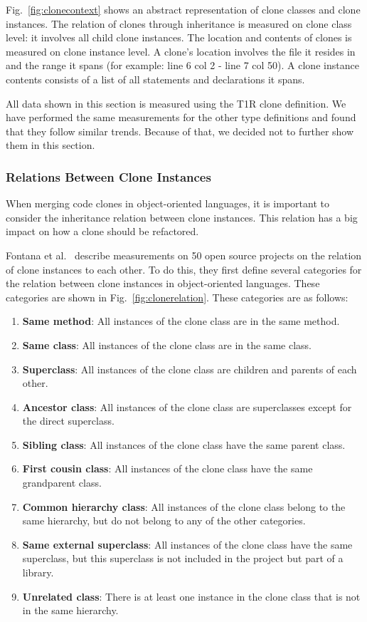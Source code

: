 \documentclass[a4paper]{article}
\begin{document}
Fig.~\ref{fig:clonecontext} shows an abstract representation of clone classes and clone instances. The relation of clones through inheritance is measured on clone class level: it involves all child clone instances. The location and contents of clones is measured on clone instance level. A clone's location involves the file it resides in and the range it spans (for example: line 6 col 2 - line 7 col 50). A clone instance contents consists of a list of all statements and declarations it spans.

All data shown in this section is measured using the T1R clone definition. We have performed the same measurements for the other type definitions and found that they follow similar trends. Because of that, we decided not to further show them in this section.

\subsubsection{Relations Between Clone Instances} \label{chap:relationsinstances}
When merging code clones in object-oriented languages, it is important to consider the inheritance relation between clone instances. This relation has a big impact on how a clone should be refactored.

Fontana et al.~\cite{fontana2015duplicated} describe measurements on 50 open source projects on the relation of clone instances to each other. To do this, they first define several categories for the relation between clone instances in object-oriented languages. These categories are shown in Fig.~\ref{fig:clonerelation}. These categories are as follows:
\begin{enumerate}
  \item \textbf{Same method}: All instances of the clone class are in the same method.
  \item \textbf{Same class}: All instances of the clone class are in the same class.
  \item \textbf{Superclass}: All instances of the clone class are children and parents of each other.
  \item \textbf{Ancestor class}: All instances of the clone class are superclasses except for the direct superclass.
  \item \textbf{Sibling class}: All instances of the clone class have the same parent class.
  \item \textbf{First cousin class}: All instances of the clone class have the same grandparent class.
\item \textbf{Common hierarchy class}: All instances of the clone class belong to the same hierarchy, but do not belong to any of the other categories.
\item \textbf{Same external superclass}: All instances of the clone class have the same superclass, but this superclass is not included in the project but part of a library.
\item \textbf{Unrelated class}: There is at least one instance in the clone class that is not in the same hierarchy.
\end{enumerate}
\end{document}
